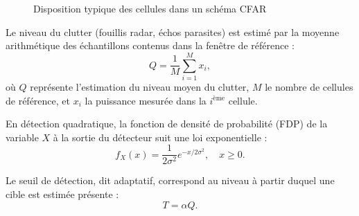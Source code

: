 \begin{figure}[h!]
\centering
{}
\caption{Disposition typique des cellules dans un schéma CFAR}
\label{fig:cellules_CFAR}
\end{figure}


Le niveau du clutter (fouillis radar, échos parasites) est estimé par la moyenne arithmétique des échantillons contenus dans la fenêtre de référence \cite{fstech_chapitre5_cfar} :
\begin{equation}
Q = \frac{1}{M} \sum_{i=1}^{M} x_i,
\end{equation}
où $Q$ représente l’estimation du niveau moyen du clutter, $M$ le nombre de cellules de référence, et $x_i$ la puissance mesurée dans la $i^{\text{ème}}$ cellule.

En détection quadratique, la fonction de densité de probabilité (FDP) de la variable $X$ à la sortie du détecteur suit une loi exponentielle :
\begin{equation}
f_X(x) = \frac{1}{2\sigma^2} e^{-x / 2\sigma^2}, \quad x \ge 0.
\end{equation}


Le seuil de détection, dit adaptatif, correspond au niveau à partir duquel une cible est estimée présente :
\begin{equation}
T = \alpha Q.
\end{equation}


